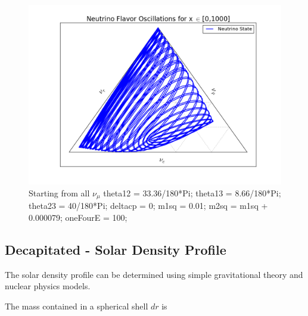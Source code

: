 \documentclass{tufte-handout}
\begin{document}
\begin{figure}
\centering
\includegraphics{assets/ternary/1000-mu-1}
\caption{ Starting from all $\nu_\mu$ \newline
theta12 = 33.36/180*Pi;\newline
theta13 = 8.66/180*Pi;\newline
theta23 = 40/180*Pi;\newline
deltacp = 0;\newline
m1sq = 0.01;\newline
m2sq = m1sq + 0.000079;\newline
oneFourE = 100; 
}
\end{figure}

























\subsection{Decapitated - Solar Density Profile}



The solar density profile can be determined using simple gravitational theory and nuclear physics models.

The mass contained in a spherical shell $dr$ is
\end{document}
